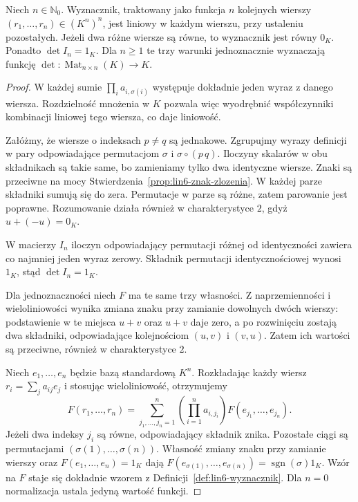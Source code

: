 \begin{twierdzenie}
\label{thm:lin6-wlasnosci-aksjomatyczne}
Niech \(n\in\mathbb N_0\).
Wyznacznik, traktowany jako funkcja
\(n\) kolejnych wierszy
\((r_1,\ldots,r_n)\in(K^n)^n\),
jest liniowy w każdym wierszu,
przy ustaleniu pozostałych.
Jeżeli dwa różne wiersze są równe,
to wyznacznik jest równy \(0_K\).
Ponadto \(\det I_n=1_K\).
Dla \(n\geq1\) te trzy warunki
jednoznacznie wyznaczają funkcję
\(\det\colon\operatorname{Mat}_{n\times n}(K)\to K\).
\end{twierdzenie}
\begin{proof}
W każdej sumie
\(\prod_i a_{i,\sigma(i)}\)
występuje dokładnie jeden wyraz
z danego wiersza. Rozdzielność
mnożenia w \(K\) pozwala więc wyodrębnić
współczynniki kombinacji liniowej
tego wiersza, co daje liniowość.

Załóżmy, że wiersze o indeksach
\(p\ne q\) są jednakowe.
Zgrupujmy wyrazy definicji w pary
odpowiadające permutacjom
\(\sigma\) i \(\sigma\circ(p\,q)\).
Iloczyny skalarów w obu składnikach
są takie same, bo zamieniamy tylko
dwa identyczne wiersze. Znaki są
przeciwne na mocy
Stwierdzenia~\ref{prop:lin6-znak-zlozenia}.
W każdej parze składniki sumują się do
zera. Permutacje w parze są różne,
zatem parowanie jest poprawne.
Rozumowanie działa również w
charakterystyce \(2\), gdyż \(u+(-u)=0_K\).

W macierzy \(I_n\) iloczyn odpowiadający
permutacji różnej od identyczności
zawiera co najmniej jeden wyraz zerowy.
Składnik permutacji identycznościowej
wynosi \(1_K\), stąd \(\det I_n=1_K\).

Dla jednoznaczności niech \(F\) ma te
same trzy własności. Z naprzemienności
i wieloliniowości wynika zmiana znaku
przy zamianie dowolnych dwóch wierszy:
podstawienie w te miejsca \(u+v\) oraz
\(u+v\) daje zero, a po rozwinięciu
zostają dwa składniki, odpowiadające
kolejnościom \((u,v)\) i \((v,u)\).
Zatem ich wartości są przeciwne,
również w charakterystyce \(2\).

Niech \(e_1,\ldots,e_n\) będzie bazą
standardową \(K^n\). Rozkładając każdy
wiersz \(r_i=\sum_j a_{ij}e_j\)
i stosując wieloliniowość, otrzymujemy
\[
 F(r_1,\ldots,r_n)
 =\sum_{j_1,\ldots,j_n=1}^n
    \left(\prod_{i=1}^n a_{i,j_i}\right)
    F(e_{j_1},\ldots,e_{j_n}).
\]
Jeżeli dwa indeksy \(j_i\) są równe,
odpowiadający składnik znika.
Pozostałe ciągi są permutacjami
\((\sigma(1),\ldots,\sigma(n))\).
Własność zmiany znaku przy zamianie
wierszy oraz \(F(e_1,\ldots,e_n)=1_K\)
dają
\(F(e_{\sigma(1)},\ldots,e_{\sigma(n)})
=\operatorname{sgn}(\sigma)1_K\).
Wzór na \(F\) staje się dokładnie
wzorem z Definicji~\ref{def:lin6-wyznacznik}.
Dla \(n=0\) normalizacja ustala
jedyną wartość funkcji.
\end{proof}

